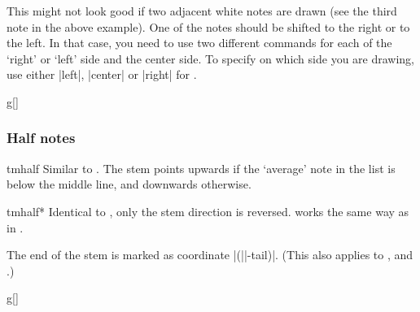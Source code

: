 \documentclass[11pt,a4paper]{ltxdoc}
\begin{document}
This might not look good if two adjacent white notes are drawn (see the third 
note in the above example). One of the notes should be shifted to the right or 
to the left. In that case, you need to use two different  
commands for each of the `right' or `left' side and the center side. To specify 
on which side you are drawing, use either |left|, |center| or |right| for 
.

\begin{dispExample}
\begin{tmsinglestaff}
  \begin{tmstaff}{g}[]
  \end{tmstaff}
\end{tmsinglestaff}
\end{dispExample}
\subsubsection{Half notes}\label{sec:music-notes:commands:half}
\begin{docCommand}{tmhalf}{}
  Similar to . The stem points upwards if the `average' note 
  in the list is below the middle line, and downwards otherwise.
\end{docCommand}
\begin{docCommand}{tmhalf*}{}
  Identical to , only the stem direction is reversed. 
   works the same way as in .
\end{docCommand}
The end of the stem is marked as coordinate |(||-tail)|. (This also 
applies to ,  and .)
\begin{dispExample}
\begin{tmsinglestaff}%
  \begin{tmstaff}{g}[]
       
  \end{tmstaff}%
\end{tmsinglestaff}
\end{dispExample}
\end{document}
